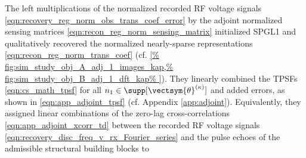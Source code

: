 The left multiplications of
the normalized recorded \ac{RF} voltage signals
\eqref{eqn:recovery_reg_norm_obs_trans_coef_error} by
the adjoint normalized sensing matrices
\eqref{eqn:recon_reg_norm_sensing_matrix} initialized
\ac{SPGL1} and qualitatively recovered
the normalized nearly-sparse representations
\eqref{eqn:recon_reg_norm_trans_coef}
(cf. \cref{%
  fig:sim_study_obj_A_adj_1_images_kap,%
  fig:sim_study_obj_B_adj_1_dft_kap%
}).
They linearly combined
the \acp{TPSF}
\eqref{eqn:cs_math_tpsf} for
all $n_{1} \in \supp[ \vectsym{\theta}^{(\kappa)} ]$ and added
errors, as shown in
\eqref{eqn:app_adjoint_tpsf}
(cf. Appendix \ref{app:adjoint}).
Equivalently,
they assigned
linear combinations of
the zero-lag cross-correlations
\eqref{eqn:app_adjoint_xcorr_td} between
the recorded \ac{RF} voltage signals
\eqref{eqn:recovery_disc_freq_v_rx_Fourier_series} and
the pulse echoes of
the admissible structural building blocks to
